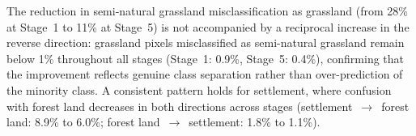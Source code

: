 The reduction in semi-natural grassland misclassification as grassland (from 28\% at Stage~1 to 11\% at Stage~5) is not accompanied by a reciprocal increase in the reverse direction: grassland pixels misclassified as semi-natural grassland remain below 1\% throughout all stages (Stage~1: 0.9\%, Stage~5: 0.4\%), confirming that the improvement reflects genuine class separation rather than over-prediction of the minority class. A consistent pattern holds for settlement, where confusion with forest land decreases in both directions across stages (settlement~$\to$~forest land: 8.9\% to 6.0\%; forest land~$\to$~settlement: 1.8\% to 1.1\%).
